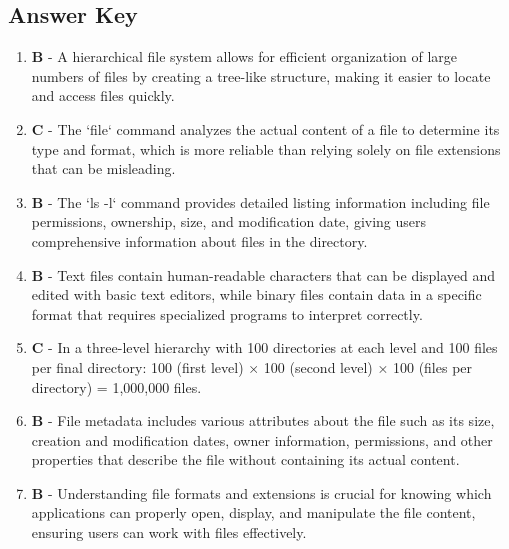 \subsection{Answer Key}

\begin{enumerate}
    \item \textbf{B} - A hierarchical file system allows for efficient organization of large numbers of files by creating a tree-like structure, making it easier to locate and access files quickly.
    
    \item \textbf{C} - The `file` command analyzes the actual content of a file to determine its type and format, which is more reliable than relying solely on file extensions that can be misleading.
    
    \item \textbf{B} - The `ls -l` command provides detailed listing information including file permissions, ownership, size, and modification date, giving users comprehensive information about files in the directory.
    
    \item \textbf{B} - Text files contain human-readable characters that can be displayed and edited with basic text editors, while binary files contain data in a specific format that requires specialized programs to interpret correctly.
    
    \item \textbf{C} - In a three-level hierarchy with 100 directories at each level and 100 files per final directory: 100 (first level) × 100 (second level) × 100 (files per directory) = 1,000,000 files.
    
    \item \textbf{B} - File metadata includes various attributes about the file such as its size, creation and modification dates, owner information, permissions, and other properties that describe the file without containing its actual content.
    
    \item \textbf{B} - Understanding file formats and extensions is crucial for knowing which applications can properly open, display, and manipulate the file content, ensuring users can work with files effectively.
\end{enumerate}
